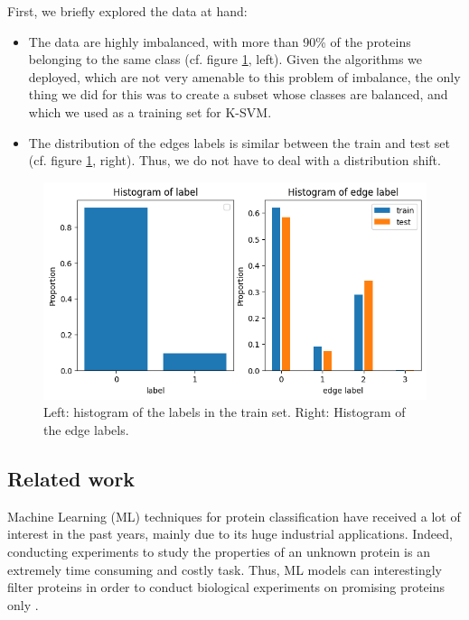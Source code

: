 \documentclass[sigconf, nonacm]{acmart}
\begin{document}
First, we briefly explored the data at hand:

\begin{itemize}
    \item The data are highly imbalanced, with more than 90\% of the proteins belonging to the same class (cf. figure \ref{fig:data_histo}, left). Given the algorithms we deployed, which are not very amenable to this problem of imbalance, the only thing we did for this was to create a subset whose classes are balanced, and which we used as a training set for K-SVM.
    \item The distribution of the edges labels is similar between the train and test set (cf. figure \ref{fig:data_histo}, right). Thus, we do not have to deal with a distribution shift.
\end{itemize}


\begin{figure}[t]
    \centering
    \includegraphics[width=\columnwidth]{figures/histograms.png}
    \caption{Left: histogram of the labels in the train set. Right: Histogram of the edge labels.}
    \label{fig:data_histo}
\end{figure}

\subsection{Related work}

Machine Learning (ML) techniques for protein classification have received a lot of interest in the past years, mainly due to its huge industrial applications. Indeed, conducting experiments to study the properties of an unknown protein is an extremely time consuming and costly task. Thus, ML models can interestingly filter proteins in order to conduct biological experiments on promising proteins only \cite{naik_active_2016}.
\end{document}
